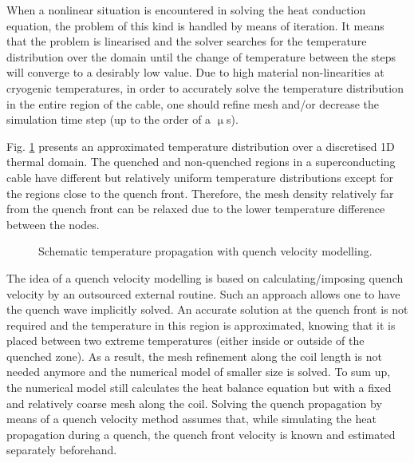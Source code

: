 
When a nonlinear situation is encountered in solving the heat conduction equation, the problem of this kind is handled by means of iteration. It means that the problem is linearised and the solver searches for the temperature distribution over the domain until the change of temperature between the steps will converge to a desirably low value. Due to high material non-linearities at cryogenic temperatures, in order to accurately solve the temperature distribution in the entire region of the cable, one should refine mesh and/or decrease the simulation time step (up to the order of a $\upmu$s).

Fig. \ref{fig:modelling_approach} presents an approximated temperature distribution over a discretised 1D thermal domain. The quenched and non-quenched regions in a superconducting cable have different but relatively uniform temperature distributions except for the regions close to the quench front. Therefore, the mesh density relatively far from the quench front can be relaxed due to the lower temperature difference between the nodes. 

\begin{figure}[H]
\centering
{}
\caption{Schematic temperature propagation with quench velocity modelling.}
\label{fig:modelling_approach}
\end{figure}

The idea of a quench velocity modelling is based on calculating/imposing quench velocity by an outsourced external routine. Such an approach allows one to have the quench wave implicitly solved. An accurate solution at the quench front is not required and the temperature in this region is approximated, knowing that it is placed between two extreme temperatures (either inside or outside of the quenched zone). As a result, the mesh refinement along the coil length is not needed anymore and the numerical model of smaller size is solved. To sum up, the numerical model still calculates the heat balance equation but with a fixed and relatively coarse mesh along the coil. Solving the quench propagation by means of a quench velocity method assumes that, while  simulating the heat propagation during a quench, the quench front velocity is known and estimated separately beforehand. 
